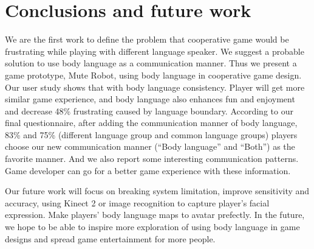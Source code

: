 \section{Conclusions and future work}



We are the first work to define the problem that cooperative game would be frustrating while playing with different language speaker. We suggest a probable solution to use body language as a communication manner. Thus we present a game prototype, Mute Robot, using body language in cooperative game design. Our user study shows that with body language consistency. Player will get more similar game experience, and body language also enhances fun and enjoyment and decrease 48\% frustrating caused by language boundary. According to our final questionnaire, 
after adding the communication manner of body language, 83\% and 75\% (different language group and common language groups) players choose our new communication manner (``Body language'' and ``Both'') as the favorite manner. 
And we also report some interesting communication patterns. Game developer can go for a better game experience with these information.

Our future work will focus on breaking system limitation, improve sensitivity and accuracy, using Kinect 2 or image recognition to capture player's facial expression.  Make players' body language maps to avatar prefectly. In the future, we hope to be able to inspire more exploration of using body language in game designs and spread game entertainment for more people.


